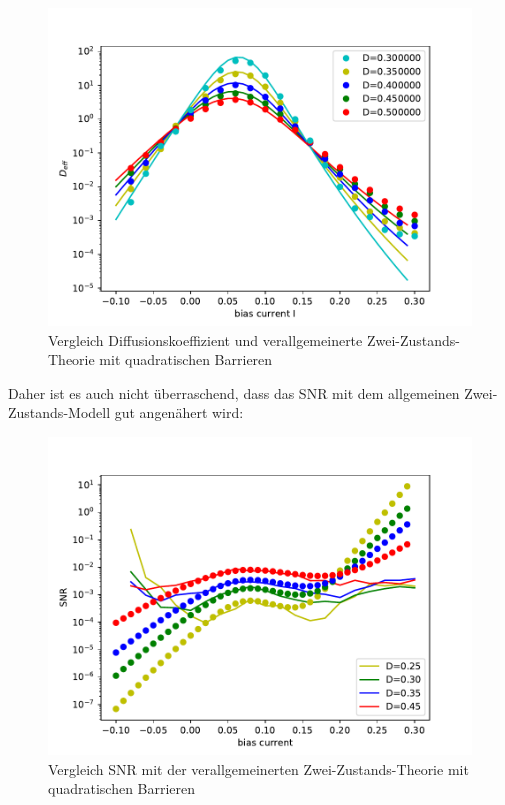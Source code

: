 \documentclass[12pt,a4paper]{article}
\begin{document}
\begin{figure}[H]
	\centering
	\includegraphics[scale=0.9]{dcompdfqnewrealfast11jjem2shrealfast19jjem2st.pdf}
	\caption{Vergleich Diffusionskoeffizient und verallgemeinerte Zwei-Zustands-Theorie mit quadratischen Barrieren}
	\label{dcompqua}
\end{figure}
Daher ist es auch nicht überraschend, dass das SNR mit dem allgemeinen Zwei-Zustands-Modell gut angenähert wird:
\begin{figure}[H]
	\centering
	\includegraphics[scale=0.9]{snrautoreal13a25snr.pdf}
	\caption{Vergleich SNR mit der verallgemeinerten Zwei-Zustands-Theorie mit quadratischen Barrieren}
	\label{snrtwo}
\end{figure}
\end{document}
